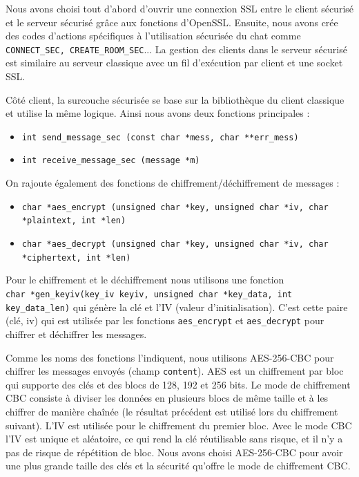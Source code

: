 \documentclass[a4paper,11pt,french]{book}
\begin{document}
Nous avons choisi tout d'abord d'ouvrir une connexion SSL entre le client sécurisé et le serveur sécurisé grâce aux fonctions d'OpenSSL. Ensuite, nous avons crée des codes d'actions spécifiques à l'utilisation sécurisée du chat comme \verb+CONNECT_SEC, CREATE_ROOM_SEC+... La gestion des clients dans le serveur sécurisé est similaire au serveur classique avec un fil d'exécution par client et une socket SSL.

Côté client, la surcouche sécurisée se base sur la bibliothèque du client classique et utilise la même logique. Ainsi nous avons deux fonctions principales : 
\begin{itemize}
\item \verb+int send_message_sec (const char *mess, char **err_mess)+
\item \verb+int receive_message_sec (message *m)+
\end{itemize}

On rajoute également des fonctions de chiffrement/déchiffrement de messages :
\small{
\begin{itemize}
\item \verb+char *aes_encrypt (unsigned char *key, unsigned char *iv, char *plaintext, int *len)+

\item \verb+char *aes_decrypt (unsigned char *key, unsigned char *iv, char *ciphertext, int *len)+
\end{itemize}
}
\large
Pour le chiffrement et le déchiffrement nous utilisons une fonction \\
 \verb+char *gen_keyiv(key_iv keyiv, unsigned char *key_data, int key_data_len)+ 
 qui génère la clé et l'IV (valeur d'initialisation). C'est cette paire (clé, iv) qui est utilisée par les fonctions \verb+aes_encrypt+ et \verb+aes_decrypt+ pour chiffrer et déchiffrer les messages.

Comme les noms des fonctions l'indiquent, nous utilisons AES-256-CBC pour chiffrer les messages envoyés (champ \verb+content+). AES est un chiffrement par bloc qui supporte des clés et des blocs de 128, 192 et 256 bits. Le mode de chiffrement CBC consiste à diviser les données en plusieurs blocs de même taille et à les chiffrer de manière chaînée (le résultat précédent est utilisé lors du chiffrement suivant). L'IV est utilisée pour le chiffrement du premier bloc. Avec le mode CBC l'IV est unique et aléatoire, ce qui rend la clé réutilisable sans risque, et il n'y a pas de risque de répétition de bloc. Nous avons choisi AES-256-CBC pour avoir une plus grande taille des clés et la sécurité qu'offre le mode de chiffrement CBC. 
\end{document}
